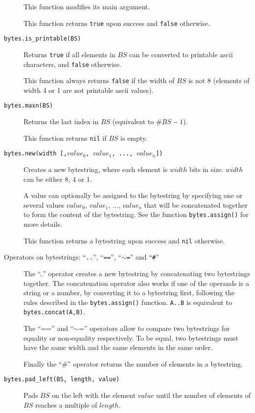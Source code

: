 \documentclass[11pt]{article}
\begin{document}
\begin{description}
{  This function modifies its main argument.

  This function returns \texttt{true} upon success and \texttt{false} otherwise.
}

\item[\texttt{bytes.is\_printable(BS)}]
{
  Returns \texttt{true} if all elements in $BS$ can be converted to 
  printable ascii characters, and \texttt{false} otherwise.

  This function always returns \texttt{false} if the width of $BS$ is 
  not 8 (elements of width 4 or 1 are not printable ascii values).  
}

\item[\texttt{bytes.maxn(BS)}]
{
  Returns the last index in $BS$ (equivalent to $\#BS-1$).

  This function returns \texttt{nil} if $BS$ is empty.
}

\item[\texttt{bytes.new(width [,$value_0$, $value_1$, ..., $value_n$])}]
{
  Creates a new bytestring, where each element is $width$ bits in size.
  $width$ can be either 8, 4 or 1.

  A value can optionally be assigned to the bytestring by specifying one or 
  several values $value_0$, $value_1$, ..., $value_n$ that will be concatenated
  together to form the content of the bytestring. See the function 
  \texttt{bytes.assign()} for more details.

  This function returns a bytestring upon success and \texttt{nil} otherwise. 
}

\item[Operators on bytestrings: ``\texttt{..}'', ``\texttt{==}'', ``\texttt{$\sim$=}'' and ``\texttt{\#}'']
{
  The ``..'' operator creates a new bytestring by concatenating two bytestrings together.
  The concatenation operator also works if one of the operands is a string or a number, 
  by converting it to a bytestring first, following the rules described in the 
  \texttt{bytes.assign()} function. 
  \texttt{A..B} is equivalent to \texttt{bytes.concat(A,B)}.
  
  The ``=='' and ``$\sim$='' operators allow to compare two bytestrings for equality or
  non-equality respectively. To be equal, two bytestrings must have the same width
  and the same elements in the same order.
 
  Finally the ``\#'' operator returns the number of elements in a bytestring.
}

\item[\texttt{bytes.pad\_left(BS, length, value)}]
{
  Pads $BS$ on the left with the element $value$ until the number of elements 
  of $BS$ reaches a multiple of $length$.

}
\end{description}
\end{document}
